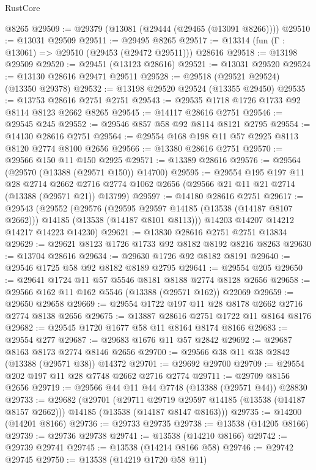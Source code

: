\begin{lexlean}{RustCore}
\begin{coremodule}
    @8265
@29509 := @29379 (@13081 (@29444 (@29465 (@13091 @8266))))
@29510 := @13031 @29509
@29511 := @29495 @8265
@29517 := @13314 (fun (Γ : @13061) => @29510 (@29453 (@29472 @29511))) @28616
@29518 := @13198 @29509
@29520 := @29451 (@13123 @28616)
@29521 := @13031 @29520
@29524 := @13130 @28616 @29471 @29511
@29528 := @29518 (@29521 @29524) (@13350 @29378)
@29532 := @13198 @29520 @29524 (@13355 @29450)
@29535 := @13753 @28616 @2751 @2751
@29543 := @29535 @1718 @1726 @1733 @92 @8114 @8123 @2662 @8265
@29545 := @14117 @28616 @2751
@29546 := @29545 @245
@29552 := @29546 @857 @58 @92 @8114 @8121 @2795
@29554 := @14130 @28616 @2751
@29564 := @29554 @168 @198 @11 @57 @2925 @8113 @8120 @2774 @8100 @2656
@29566 := @13380 @28616 @2751
@29570 := @29566 @150 @11 @150 @2925
@29571 := @13389 @28616
@29576 := @29564 (@29570 (@13388 (@29571 @150)) @14700)
@29595 := @29554
    @195
    @197
    @11
    @28
    @2714
    @2662
    @2716
    @2774
    @1062
    @2656
    (@29566 @21 @11 @21 @2714 (@13388 (@29571 @21)) @13799)
@29597 := @14180 @28616 @2751
@29617 := @29543
    (@29552
      (@29576
        (@29595 @29597 @14185 (@13538 (@14187 @8107 @2662)))
        @14185
        (@13538 (@14187 @8101 @8113)))
      @14203
      @14207
      @14212
      @14217
      @14223
      @14230)
@29621 := @13830 @28616 @2751 @2751 @13834
@29629 := @29621 @8123 @1726 @1733 @92 @8182 @8192 @8216 @8263
@29630 := @13704 @28616
@29634 := @29630 @1726 @92 @8182 @8191
@29640 := @29546 @1725 @58 @92 @8182 @8189 @2795
@29641 := @29554 @205
@29650 := @29641 @1724 @11 @57 @5546 @8181 @8188 @2774 @8128 @2656
@29658 := @29566 @162 @11 @162 @5546 (@13388 (@29571 @162)) @22069
@29659 := @29650 @29658
@29669 := @29554 @1722 @197 @11 @28 @8178 @2662 @2716 @2774 @8138 @2656
@29675 := @13887 @28616 @2751 @1722 @11 @8164 @8176
@29682 := @29545 @1720 @1677 @58 @11 @8164 @8174 @8166
@29683 := @29554 @277
@29687 := @29683 @1676 @11 @57 @2842
@29692 := @29687 @8163 @8173 @2774 @8146 @2656
@29700 := @29566 @38 @11 @38 @2842 (@13388 (@29571 @38)) @14372
@29701 := @29692 @29700
@29709 := @29554 @202 @197 @11 @28 @7748 @2662 @2716 @2774
@29711 := @29709 @8156 @2656
@29719 := @29566 @44 @11 @44 @7748 (@13388 (@29571 @44)) @28830
@29733 := @29682
    (@29701
      (@29711 @29719 @29597 @14185 (@13538 (@14187 @8157 @2662)))
      @14185
      (@13538 (@14187 @8147 @8163)))
@29735 := @14200 (@14201 @8166)
@29736 := @29733 @29735
@29738 := @13538 (@14205 @8166)
@29739 := @29736 @29738
@29741 := @13538 (@14210 @8166)
@29742 := @29739 @29741
@29745 := @13538 (@14214 @8166 @58)
@29746 := @29742 @29745
@29750 := @13538 (@14219 @1720 @58 @11)

\end{coremodule}
\end{lexlean}
